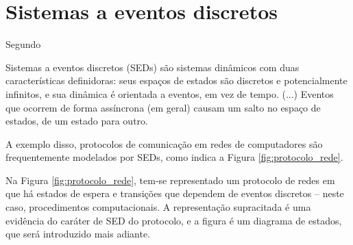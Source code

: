 \chapter{Sistemas a eventos discretos}

Segundo  \begin{citacao} Sistemas a eventos discretos (\acs{SED}s) são sistemas dinâmicos com duas características definidoras: seus espaços de estados são discretos e potencialmente infinitos, e sua dinâmica é orientada a eventos, em vez de tempo. (...) Eventos que ocorrem de forma assíncrona (em geral) causam um salto no espaço de estados, de um estado para outro. \end{citacao} A exemplo disso, protocolos de comunicação em redes de computadores são frequentemente modelados por SEDs, como indica a Figura \ref{fig:protocolo_rede}.


Na Figura \ref{fig:protocolo_rede}, tem-se representado um protocolo de redes em que há estados de espera e transições que dependem de eventos discretos -- neste caso, procedimentos computacionais. A representação supracitada é uma evidência do caráter de SED do protocolo, e a figura é um diagrama de estados, que será introduzido mais adiante.

